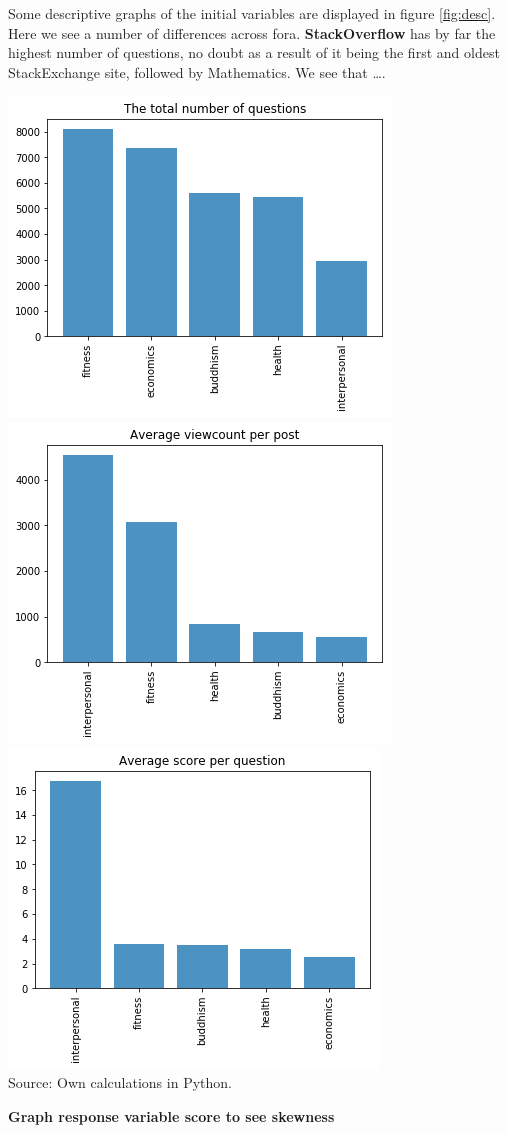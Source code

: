 \documentclass[11pt,preprint, authoryear]{article}
\let\origfigure\figure
\let\endorigfigure\endfigure
\renewenvironment{figure}[1][2] {
    \expandafter\origfigure\expandafter[H]
} {
    \endorigfigure
}
\numberwithin{equation}{section}
\numberwithin{figure}{section}
\begin{document}
Some descriptive graphs of the initial variables are displayed in figure
\ref{fig:desc}. Here we see a number of differences across fora.
\textbf{StackOverflow} has by far the highest number of questions, no
doubt as a result of it being the first and oldest StackExchange site,
followed by Mathematics. We see that \ldots{}.

\renewcommand{\thefigure}{\arabic{figure}}

\footnotesize

\begin{figure}
\caption{\textbf{Fora Descriptive Statistics}}
\label{fig:desc}
\begin{minipage}{1\textwidth}

\includegraphics[width=0.32\linewidth]{../../01-python-code/00-workspace/01-graphs/post-counts-bar-graph} 
\includegraphics[width=0.32\linewidth]{../../01-python-code/00-workspace/01-graphs/ave-views-bar-graph} 
\includegraphics[width=0.32\linewidth]{../../01-python-code/00-workspace/01-graphs/ave-score-bar-graph} 
\\ \centering
{\footnotesize Source: Own calculations in Python.}
\end{minipage}
\end{figure}

\normalsize

\textbf{Graph response variable score to see skewness}
\end{document}
